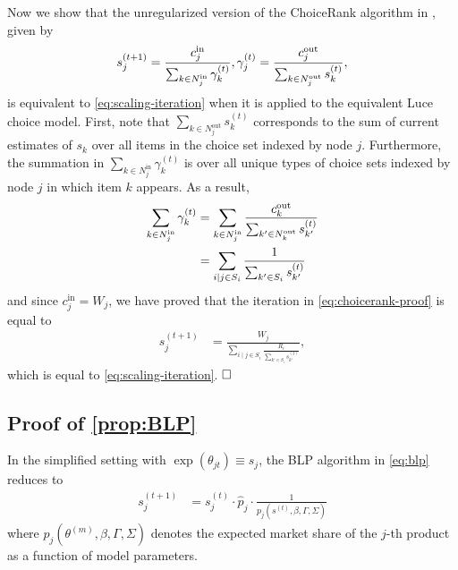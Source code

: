 Now we show that the unregularized version of the ChoiceRank algorithm in \citet{maystre2017choicerank}, given by
\begin{align}
\label{eq:choicerank-proof}
    s_j^{(t+1)} = \frac{c_j^{\text{in}}}{\sum_{k\in N_j^{\text{in}}} \gamma_k^{(t)}}, \gamma_j^{(t)}=\frac{c_j^{\text{out}}}{\sum_{k\in N_j^{\text{out}}}s_k^{(t)}},
\end{align}
is equivalent to \eqref{eq:scaling-iteration} when it is applied to the equivalent Luce choice model. First, note that ${\sum_{k\in N_{j}^{\text{out}}}s_{k}^{(t)}}$
corresponds to the sum of current estimates of $s_k$ over all items in the choice set indexed by node $j$. Furthermore, the summation in $\sum_{k\in N_{j}^{\text{in}}}\gamma_{k}^{(t)}$
is over all unique types of choice sets indexed by node $j$ in which item $k$ appears. As a result, 
\begin{align*}
    \sum_{k\in N_j^{\text{in}}} \gamma_k^{(t)} & = \sum_{k\in N_j^{\text{in}}} \frac{c_k^{\text{out}}}{\sum_{k'\in N_k^{\text{out}}}s_{k'}^{(t)}}\\
    &={\sum_{i\mid j\in S_{i}}\frac{1}{\sum_{k'\in S_{i}}s_{k'}^{(t)}}}
\end{align*}
and since $c_{j}^{\text{in}}=W_j$, we have proved that the iteration in \eqref{eq:choicerank-proof} is equal to \begin{align*}
s_{j}^{(t+1)} & =\frac{W_{j}}{\sum_{i\mid j\in S_{i}}\frac{R_i}{\sum_{k'\in S_{i}}s_{k'}^{(t)}}},
\end{align*}
which is equal to \eqref{eq:scaling-iteration}. $\hfill \square$

\subsection{Proof of \cref{prop:BLP}}
In the simplified setting with $\exp(\theta_{jt})\equiv s_{j}$, the BLP algorithm in \eqref{eq:blp} reduces to \begin{align*}
s_{j}^{(t+1)} & =s_{j}^{(t)}\cdot\hat{p}_{j}\cdot\frac{1}{p_{j}(s^{(t)},\beta,\Gamma,\Sigma)}
\end{align*}
where $p_{j}(\theta^{(m)},\beta,\Gamma,\Sigma)$ denotes the expected market share of the $j$-th product as a function of model parameters. 

